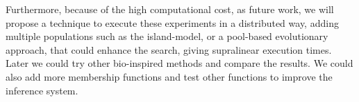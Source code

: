 \documentclass[symmetry,article,submit,moreauthors,pdftex]{Definitions/mdpi}
\begin{document}
\begin{paracol}{2}
\linenumbers
\switchcolumn





Furthermore, because of the high computational cost, as future work, we will
propose a technique to execute these experiments in a distributed way, adding
multiple populations such as the island-model, or a pool-based evolutionary
approach, that could enhance the search, giving supralinear execution times.
Later we could try other bio-inspired methods and compare the results. We could
also add more membership functions and test other functions to improve the
inference system.




%
%
\vspace{6pt} 




\end{paracol}
\end{document}
